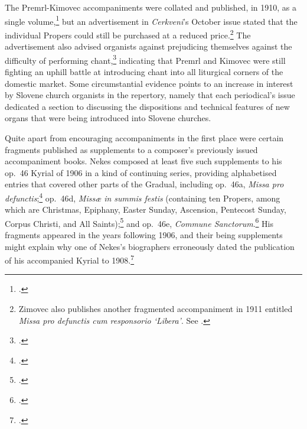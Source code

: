 The Premrl-Kimovec accompaniments were collated and published, in 1910, as a single volume,\footnote{\covid{}\cite{KimovecIntroitusCommunionespro1910}.} but an advertisement in \emph{Cerkveni}'s October issue stated that the individual Propers could still be purchased at a reduced price.\footnote{Zimovec also publishes another fragmented accompaniment in 1911 entitled \emph{Missa pro defunctis cum responsorio `Libera'}. See \cite[226]{SlebingerSlovenskabibliografijaza1913}.}
The advertisement also advised organists against prejudicing themselves against the difficulty of performing chant,\footcite[80]{P[remrl]Oglasnik1910} indicating that Premrl and Kimovec were still fighting an uphill battle at introducing chant into all  liturgical corners of the domestic market.
Some circumstantial evidence points to an increase in interest by Slovene church organists in the repertory, namely that each periodical's issue dedicated a section to discussing the dispositions and technical features of new organs that were being introduced into Slovene churches.

Quite apart from encouraging accompaniments in the first place were certain fragments published as supplements to a composer's previously issued accompaniment books.
Nekes composed at least five such supplements to his op.~46 Kyrial of 1906 in a kind of continuing series, providing alphabetised entries that covered other parts of the Gradual, including op.~46a, \emph{Missa pro defunctis};\footnote{.} op.~46d, \emph{Missæ in summis festis} (containing ten Propers, among which are Christmas, Epiphany, Easter Sunday, Ascension, Pentecost Sunday, Corpus Christi, and All Saints);\footcite[7]{Organaria1910} and op.~46e, \emph{Commune Sanctorum}.\footcite[95]{BesprechungenVerschiedeneKompositionen1911}
His fragments appeared in the years following 1906, and their being supplements might explain why one of Nekes's biographers erroneously dated the publication of his accompanied Kyrial to 1908.\footcite[205]{WagnerFranzNekesund1969}
\nowidow[2]
